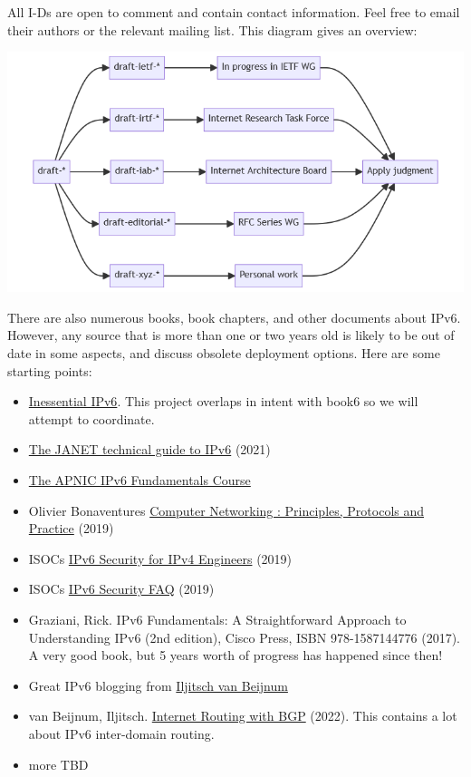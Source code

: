\documentclass[
]{article}
\begin{document}
All I-Ds are open to comment and contain contact information. Feel free
to email their authors or the relevant mailing list. This diagram gives
an overview:

\includegraphics{id-diagram.png}

There are also numerous books, book chapters, and other documents about
IPv6. However, any source that is more than one or two years old is
likely to be out of date in some aspects, and discuss obsolete
deployment options. Here are some starting points:

\begin{itemize}
\item
  \href{https://docs.google.com/document/d/1WohukYWdlFcEaSm-SQtX5Zgrkr-FZiZnfhlvoFi5Bl0/edit}{Inessential
  IPv6}. This project overlaps in intent with book6 so we will attempt
  to coordinate.
\item
  \href{https://repository.jisc.ac.uk/8349/1/janet-ipv6-technical-guide.pdf}{The
  JANET technical guide to IPv6} (2021)
\item
  \href{https://academy.apnic.net/en/course/ipv6-fundamentals}{The APNIC
  IPv6 Fundamentals Course}
\item
  Olivier Bonaventure\textquotesingle s
  \href{https://beta.computer-networking.info/syllabus/default/protocols/ipv6.html\#ip-version-6}{Computer
  Networking : Principles, Protocols and Practice} (2019)
\item
  ISOC\textquotesingle s
  \href{https://www.internetsociety.org/resources/deploy360/ipv6/security/ipv4-engineers/}{IPv6
  Security for IPv4 Engineers} (2019)
\item
  ISOC\textquotesingle s
  \href{https://www.internetsociety.org/deploy360/ipv6/security/faq/}{IPv6
  Security FAQ} (2019)
\item
  Graziani, Rick. IPv6 Fundamentals: A Straightforward Approach to
  Understanding IPv6 (2nd edition), Cisco Press, ISBN 978-1587144776
  (2017). A very good book, but 5 years\textquotesingle{} worth of
  progress has happened since then!
\item
  Great IPv6 blogging from \href{https://ipv6.iljitsch.com/}{Iljitsch
  van Beijnum}
\item
  van Beijnum, Iljitsch.
  \href{https://www.iljitsch.com/2022/11-18-new-e-book-internet-routing-with-bgp.html}{Internet
  Routing with BGP} (2022). This contains a lot about IPv6 inter-domain
  routing.
\item
  more TBD
\end{itemize}
\end{document}
